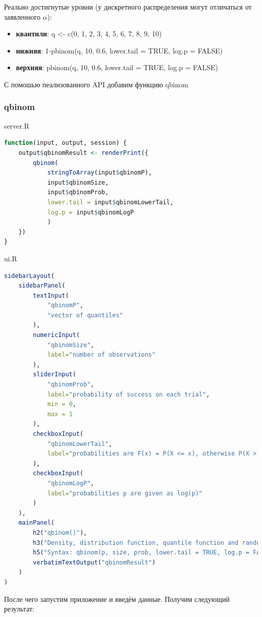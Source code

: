 \documentclass[14pt,a4paper]{scrartcl}
\begin{document}
	Реально достигнутые уровни (у дискретного распределения могут отличаться от заявленного $\alpha$):
    \begin{itemize}
        \item \textbf{квантили}: q <- c(0, 1, 2, 3, 4, 5, 6, 7, 8, 9, 10)
        \item \textbf{нижняя}: 1-pbinom(q, 10, 0.6, lower.tail = TRUE, log.p = FALSE)
        \item \textbf{верхняя}: pbinom(q, 10, 0.6, lower.tail = TRUE, log.p = FALSE)
    \end{itemize}

	С помошью пеализованного API добавим функцию qbinom
    \subsubsection[qbinom]{qbinom}
    server.R
    \begin{lstlisting}[language=R]
function(input, output, session) {
    output$qbinomResult <- renderPrint({
        qbinom(
            stringToArray(input$qbinomP),
            input$qbinomSize,
            input$qbinomProb,
            lower.tail = input$qbinomLowerTail,
            log.p = input$qbinomLogP
            )
    })
}
    \end{lstlisting}

    ui.R
    \begin{lstlisting}[language=R]
sidebarLayout(
    sidebarPanel(
        textInput(
            "qbinomP",
            "vector of quantiles"
        ),
        numericInput(
            "qbinomSize",
            label="number of observations"
        ),
        sliderInput(
            "qbinomProb",
            label="probability of success on each trial",
            min = 0,
            max = 1
        ),
        checkboxInput(
            "qbinomLowerTail",
            label="probabilities are F(x) = P(X <= x), otherwise P(X > x) = 1 --- F(x)."
        ),
        checkboxInput(
            "qbinomLogP",
            label="probabilities p are given as log(p)"
        )
    ),
    mainPanel(
        h2("qbinom()"),
        h3("Density, distribution function, quantile function and random generation for the binomial distribution with parameters size and prob"),
        h5("Syntax: qbinom(p, size, prob, lower.tail = TRUE, log.p = FALSE)."),
        verbatimTextOutput("qbinomResult")
    )
)
    \end{lstlisting}

    \newpage
    После чего запустим приложение и введём данные. Получим следующий результат:\\
\end{document}
